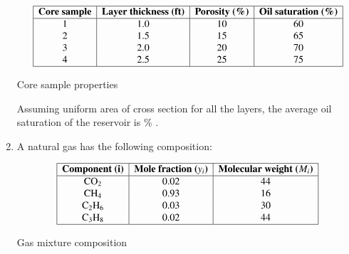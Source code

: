 \documentclass[journal,12pt,onecolumn]{IEEEtran}
\theoremstyle{remark}
\begin{document}
\begin{enumerate}
\begin{table}[h!]
\centering
\[
\begin{array}{|c|c|c|c|}
\hline
\textbf{Core sample} & \textbf{Layer thickness (ft)} & \textbf{Porosity (\%)} & \textbf{Oil saturation (\%)} \\
\hline
1 & 1.0 & 10 & 60 \\
2 & 1.5 & 15 & 65 \\
3 & 2.0 & 20 & 70 \\
4 & 2.5 & 25 & 75 \\
\hline
\end{array}
\]
\caption{Core sample properties}
\label{tab:core}
\end{table}


Assuming uniform area of cross section for all the layers, the average oil saturation of the reservoir is \underline{\hspace{1cm}} \% .
\begin{enumerate}
\end{enumerate}
\hfill{}



 \item A natural gas has the following composition:

\begin{table}[h!]
\centering
\[
\begin{array}{|c|c|c|}
\hline
\textbf{Component (i)} & \textbf{Mole fraction ($y_i$)} & \textbf{Molecular weight ($M_i$)} \\
\hline
\text{CO}_2     & 0.02 & 44 \\
\text{CH}_4     & 0.93 & 16 \\
\text{C}_2\text{H}_6 & 0.03 & 30 \\
\text{C}_3\text{H}_8 & 0.02 & 44 \\
\hline
\end{array}
\]
\caption{Gas mixture composition}
\label{tab:composition}
\end{table}



\end{enumerate}
\end{document}
